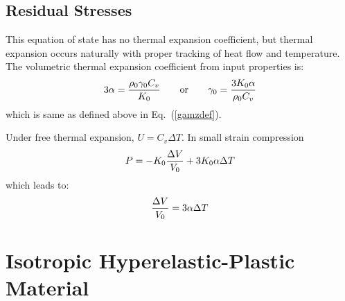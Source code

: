 \documentclass[11pt]{book}
\begin{document}
\subsection{Residual Stresses}

This equation of state has no thermal expansion coefficient, but thermal expansion occurs naturally with proper tracking of heat flow and temperature. The volumetric thermal expansion coefficient from input properties is:
\begin{equation}
     3\alpha = {\rho_0 \gamma_0 C_v\over K_0} \qquad{\rm or}\qquad \gamma_0 = {3K_0\alpha\over \rho_0 C_v}
\end{equation}
which is same as defined above in Eq.~(\ref{gamzdef}).

Under free thermal expansion, $U = C_v\Delta T$. In small strain compression
\begin{equation}
      P = -K_0{\Delta V\over V_0} + 3K_0\alpha \Delta T
\end{equation}
which leads to:
\begin{equation}
   {\Delta V\over V_0} = 3\alpha \Delta T
\end{equation}

\section{Isotropic Hyperelastic-Plastic Material}
\end{document}
